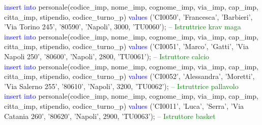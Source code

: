\documentclass{article}
\begin{document}
\begin{flushleft}
{        \vspace{2mm}
        \hspace*{0.5em}\textcolor{blue}{insert into} personale(codice\_imp, nome\_imp, cognome\_imp, via\_imp, cap\_imp, \hspace*{0.5em}citta\_imp, stipendio, codice\_turno\_p) \textcolor{blue}{values} ('CI0050', 'Francesca', 'Barbieri', \hspace*{0.5em}'Via Torino \hspace*{0.5em}245', '80590', 'Napoli', 3000, 'TU0060'); \hspace*{0.5em} \textcolor{green}{-- Istruttrice krav maga} \\
        \vspace{2mm}
        \hspace*{0.5em}\textcolor{blue}{insert into} personale(codice\_imp, nome\_imp, cognome\_imp, via\_imp, cap\_imp, \hspace*{0.5em}citta\_imp, stipendio, codice\_turno\_p) \textcolor{blue}{values} ('CI0051', 'Marco', 'Gatti', 'Via \hspace*{0.5em}Napoli 250', \hspace*{0.5em}'80600', 'Napoli', 2800, 'TU0061'); \hspace*{0.5em} \textcolor{green}{-- Istruttore calcio} \\
        \vspace{2mm}
        \hspace*{0.5em}\textcolor{blue}{insert into} personale(codice\_imp, nome\_imp, cognome\_imp, via\_imp, cap\_imp, \hspace*{0.5em}citta\_imp, stipendio, codice\_turno\_p) \textcolor{blue}{values} ('CI0052', 'Alessandra', 'Moretti', \hspace*{0.5em}'Via Salerno \hspace*{0.5em}255', '80610', 'Napoli', 3200, 'TU0062'); \hspace*{0.5em} \textcolor{green}{-- Istruttrice \hspace*{0.5em}pallavolo} \\
        \vspace{2mm}
        \hspace*{0.5em}\textcolor{blue}{insert into} personale(codice\_imp, nome\_imp, cognome\_imp, via\_imp, cap\_imp, \hspace*{0.5em}citta\_imp, stipendio, codice\_turno\_p) \textcolor{blue}{values} ('CI0011', 'Luca', 'Serra', 'Via \hspace*{0.5em}Catania 260', \hspace*{0.5em}'80620', 'Napoli', 2900, 'TU0063'); \hspace*{0.5em} \textcolor{green}{-- Istruttore basket} \\
}
\end{flushleft}
\end{document}
